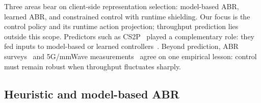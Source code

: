 Three areas bear on client-side representation selection: model-based ABR, learned ABR, and constrained control with runtime shielding.
Our focus is the control policy and its runtime action projection; throughput prediction lies outside this scope.
Predictors such as CS2P~\cite{sun2016cs2p} played a complementary role: they fed inputs to model-based or learned controllers~\cite{yin2015control,mao2017neural}.
Beyond prediction, ABR surveys~\cite{bentaleb2018survey,seufert2015survey,peroni2025survey,timmerer2025has} and \mbox{5G/mmWave} measurements~\cite{narayanan2021variegated,fezeu2024midband} agree on one empirical lesson: control must remain robust when throughput fluctuates sharply.

\subsection{Heuristic and model-based ABR}

